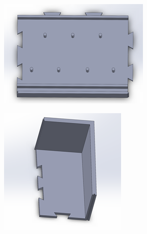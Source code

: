 \begin{figure}[h!]
\begin{subfigure}[b]{0.45\textwidth}
    \end{subfigure}
    \begin{subfigure}[b]{0.45\textwidth}
      \centering
      \includegraphics[width=\textwidth]{image/BodyModel6.png}
    \end{subfigure}
    \begin{subfigure}[b]{0.45\textwidth}
      \centering
      \includegraphics[width=\textwidth]{image/BodyModel7.png}
    \end{subfigure}

\end{figure}
